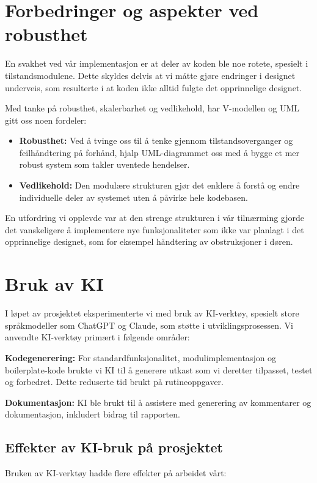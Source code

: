 \section{Forbedringer og aspekter ved robusthet}
En svakhet ved vår implementasjon er at deler av koden ble noe rotete, spesielt i tilstandsmodulene. Dette skyldes delvis at vi måtte gjøre endringer i designet underveis, som resulterte i at koden ikke alltid fulgte det opprinnelige designet.

Med tanke på robusthet, skalerbarhet og vedlikehold, har V-modellen og UML gitt oss noen fordeler:

\begin{itemize}
    \item \textbf{Robusthet:} Ved å tvinge oss til å tenke gjennom tilstandsoverganger og feilhåndtering på forhånd, hjalp UML-diagrammet oss med å bygge et mer robust system som takler uventede hendelser.
    
    \item \textbf{Vedlikehold:} Den modulære strukturen gjør det enklere å forstå og endre individuelle deler av systemet uten å påvirke hele kodebasen.
\end{itemize}

En utfordring vi opplevde var at den strenge strukturen i vår tilnærming gjorde det vanskeligere å implementere nye funksjonaliteter som ikke var planlagt i det opprinnelige designet, som for eksempel håndtering av obstruksjoner i døren.


\section{Bruk av KI}
I løpet av prosjektet eksperimenterte vi med bruk av KI-verktøy, spesielt store språkmodeller som ChatGPT og Claude, som støtte i utviklingsprosessen.
Vi anvendte KI-verktøy primært i følgende områder:

\textbf{Kodegenerering:} For standardfunksjonalitet, modulimplementasjon og boilerplate-kode brukte vi KI til å generere utkast som vi deretter tilpasset, testet og forbedret. Dette reduserte tid brukt på rutineoppgaver.

\textbf{Dokumentasjon:} KI ble brukt til å assistere med generering av kommentarer og dokumentasjon, inkludert bidrag til rapporten.

\subsection{Effekter av KI-bruk på prosjektet}
Bruken av KI-verktøy hadde flere effekter på arbeidet vårt:

